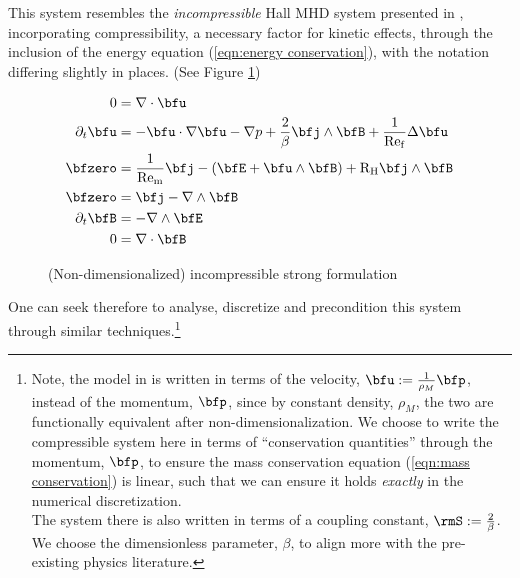     This system resembles the \emph{incompressible} Hall MHD system presented in \cite{LHF22}, incorporating compressibility, a necessary factor for kinetic effects, through the inclusion of the energy equation (\ref{eqn:energy conservation}), with the notation differing slightly in places. (See Figure \ref{fig:incompressible strong form})

    \begin{figure}
        \centering
        \line
        \begin{align}
            0  &=  \nabla\cdot\bfu  \label{eqn:incompressible mass conservation}  \\
            \partial_{t}\bfu  &=  - \bfu\cdot\nabla\bfu - \nabla p + \frac{2}{\beta}\bfj\wedge\bfB + \frac{1}{\rmRef}\Delta\bfu  \label{eqn:incompressible momentum conservation}  \\
            \bfzero  &=  \frac{1}{\rmRem}\bfj - \left(\bfE + \bfu\wedge\bfB\right) + \rmRH\bfj\wedge\bfB  \label{eqn:incompressible current identity}  \\
            \bfzero  &=  \bfj - \nabla\wedge\bfB  \label{eqn:incompressible Ampère's law}  \\
            \partial_{t}\bfB  &=  - \nabla\wedge\bfE  \label{eqn:incompressible Faraday's law}  \\
            0  &=  \nabla\cdot\bfB  \label{eqn:incompressible Gauss's law}
        \end{align}
        \line
        \caption{(Non-dimensionalized) incompressible strong formulation}
        \label{fig:incompressible strong form}
    \end{figure}

    One can seek therefore to analyse, discretize and precondition this system through similar techniques.\footnote{Note, the model in \cite{LHF22} is written in terms of the velocity, $\bfu  :=  \frac{1}{\rho_{M}}\bfp$, instead of the momentum, $\bfp$, since by constant density, $\rho_{M}$, the two are functionally equivalent after non-dimensionalization. We choose to write the compressible system here in terms of ``conservation quantities'' through the momentum, $\bfp$, to ensure the mass conservation equation (\ref{eqn:mass conservation}) is linear, such that we can ensure it holds \emph{exactly} in the numerical discretization. \\ The system there is also written in terms of a coupling constant, $\rmS  :=  \frac{2}{\beta}$. We choose the dimensionless parameter, $\beta$, to align more with the pre-existing physics literature. \BA{([Ref])}}
    
